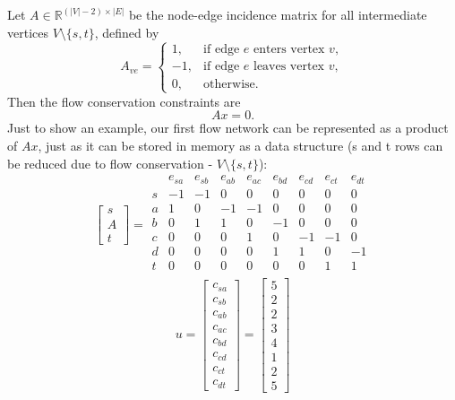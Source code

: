 Let \(A \in \mathbb{R}^{(|V|-2)\times |E|}\) be the node-edge incidence matrix for all intermediate vertices \(V\setminus\{s,t\}\), defined by
\[
A_{ve}=
\begin{cases}
1, & \text{if edge } e \text{ enters vertex } v,\\
-1, & \text{if edge } e \text{ leaves vertex } v,\\
0, & \text{otherwise.}
\end{cases}
\]
Then the flow conservation constraints are
\[
Ax=0.
\]
Just to show an example, our first flow network can be represented as a product of \(Ax\), just as it can be stored in memory as a data structure (s and t rows can be reduced due to flow conservation - \(V\setminus\{s,t\}\)):
\[
\begin{bmatrix}
s \\
A \\
t
\end{bmatrix}
=
\begin{array}{c|ccccccccc}
 & e_{sa} & e_{sb} & e_{ab} & e_{ac} & e_{bd} & e_{cd} & e_{ct}& e_{dt}\\
\hline
s & -1 & -1 & 0 & 0 & 0 & 0 & 0 & 0\\
a & 1 & 0 & -1 & -1 & 0 & 0 & 0 & 0 \\
b & 0 & 1 & 1 & 0 & -1 & 0 & 0 & 0 \\
c & 0 & 0 & 0 & 1 & 0 & -1 & -1 & 0\\
d & 0 & 0 & 0 & 0 & 1 & 1 & 0 & -1 \\
t & 0 & 0 & 0 & 0 & 0 & 0 & 1 & 1 \\
\end{array}
\]
\[
u=
\begin{bmatrix}
c_{sa} \\
c_{sb} \\
c_{ab} \\
c_{ac} \\
c_{bd} \\
c_{cd} \\
c_{ct} \\
c_{dt}
\end{bmatrix}
=
\begin{bmatrix}
5\\
2\\
2\\
3\\
4\\
1\\
2\\
5
\end{bmatrix}
\]
